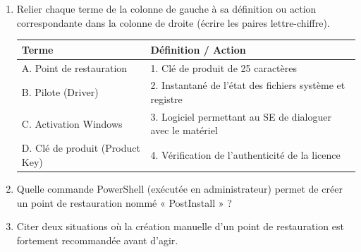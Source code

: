 \documentclass[11pt]{article}
\begin{document}
\begin{exercice}
\begin{enumerate}
    \item Relier chaque terme de la colonne de gauche à sa définition ou action correspondante dans la colonne de droite (écrire les paires lettre-chiffre).
    \begin{tabular}{|l|l|}
    \hline
    \textbf{Terme} & \textbf{Définition / Action} \\ \hline
    A. Point de restauration & 1. Clé de produit de 25 caractères \\ \hline
    B. Pilote (Driver) & 2. Instantané de l'état des fichiers système et registre \\ \hline
    C. Activation Windows & 3. Logiciel permettant au SE de dialoguer avec le matériel \\ \hline
    D. Clé de produit (Product Key) & 4. Vérification de l'authenticité de la licence \\ \hline
    \end{tabular}
    \item Quelle commande PowerShell (exécutée en administrateur) permet de créer un point de restauration nommé « PostInstall » ?
    \item Citer deux situations où la création manuelle d'un point de restauration est fortement recommandée avant d'agir.
\end{enumerate}
\end{exercice}
\end{document}
